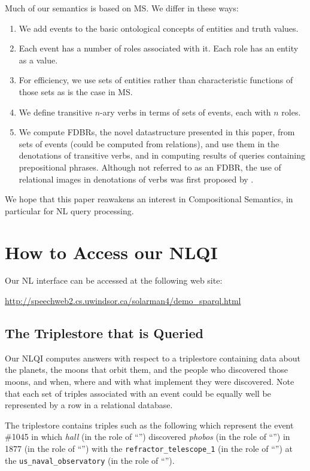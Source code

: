 \documentclass[../main.tex]{subfiles}
\begin{document}
\begin{refsection}
Much of our semantics is based on MS. We differ in these ways:
\begin{enumerate}
	\item We add events to the basic ontological concepts of entities and truth values.
	\item Each event has a number of roles associated with it. Each role has an entity as a value.
	\item For efficiency, we use sets of entities rather than characteristic functions of those sets as is the case in MS.
	\item We define transitive $n$-ary verbs in terms of sets of events, each with $n$ roles.
	\item We compute FDBRs, the novel datastructure presented in this paper, from sets of events (could be computed from relations), and use them in the denotations of transitive verbs, and in computing results of queries containing prepositional phrases. Although not referred to as an FDBR, the use of relational images in denotations of verbs was first proposed by \cite{frost1989constructing}.
\end{enumerate}

We hope that this paper reawakens an interest in Compositional Semantics, in particular for NL query processing.

\section{How to Access our NLQI}
\label{webist2019conf:access}

Our NL interface can be accessed at the following web site:

\begin{center}
	\url{http://speechweb2.cs.uwindsor.ca/solarman4/demo_sparql.html}
\end{center}

\subsection{The Triplestore that is Queried}
\label{webist2019conf:triplestore}
Our NLQI computes answers with respect to a triplestore containing data about the planets, the moons that orbit them, and the people who discovered those moons, and when, where and with what implement they were discovered. Note that each set of triples associated with an event could be equally well be represented by a row in a relational database.

The triplestore contains triples such as the following which represent the event \#1045 in which \textit{hall} (in the role of ``'') discovered \textit{phobos} (in the role of ``'') in 1877 (in the role of ``'') with the \texttt{refractor\_telescope\_1} (in the role of ``'')  at the \texttt{us\_naval\_observatory} (in the role of ``'').


\end{refsection}
\end{document}
